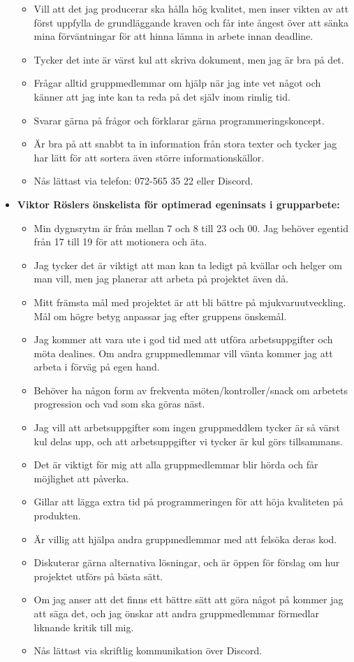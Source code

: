 \documentclass{mall}
\begin{document}
\begin{itemize}
\begin{itemize}
  \item Vill att det jag producerar ska hålla hög kvalitet, men inser vikten av att först uppfylla de grundläggande kraven och får inte ångest över att sänka mina förväntningar för att hinna lämna in arbete innan deadline. 
  \item Tycker det inte är värst kul att skriva dokument, men jag är bra på det.
  \item Frågar alltid gruppmedlemmar om hjälp när jag inte vet något och känner att jag inte kan ta reda på det själv inom rimlig tid.
  \item Svarar gärna på frågor och förklarar gärna programmeringskoncept.
  \item Är bra på att snabbt ta in information från stora texter och tycker jag har lätt för att sortera även större informationskällor.
  \item Nås lättast via telefon: 072-565 35 22 eller Discord.
  \end{itemize}

\item \textbf{Viktor Röslers önskelista för optimerad egeninsats i grupparbete:}
  \begin{itemize}
  \item Min dygnsrytm är från mellan 7 och 8 till 23 och 00. Jag behöver egentid från 17 till 19 för att motionera och äta.  
  \item Jag tycker det är viktigt att man kan ta ledigt på kvällar och helger om man vill, men jag planerar att arbeta på projektet även då.  
  \item Mitt främsta mål med projektet är att bli bättre på mjukvaruutveckling. Mål om högre betyg anpassar jag efter gruppens önskemål. 
  \item Jag kommer att vara ute i god tid med att utföra arbetsuppgifter och möta dealines. Om andra gruppmedlemmar vill vänta kommer jag att arbeta i förväg på egen hand.
  \item Behöver ha någon form av frekventa möten/kontroller/snack om arbetets progression och vad som ska göras näst.
  \item Jag vill att arbetsuppgifter som ingen gruppmeddlem tycker är så värst kul delas upp, och att arbetsuppgifter vi tycker är kul görs tillsammans. 
  \item Det är viktigt för mig att alla gruppmedlemmar blir hörda och får möjlighet att påverka.
  \item Gillar att lägga extra tid på programmeringen för att höja kvaliteten på produkten.   
  \item Är villig att hjälpa andra gruppmedlemmar med att felsöka deras kod.
  \item Diskuterar gärna alternativa lösningar, och är öppen för förslag om hur projektet utförs på bästa sätt.
  \item Om jag anser att det finns ett bättre sätt att göra något på kommer jag att säga det, och jag önskar att andra gruppmedlemmar förmedlar liknande kritik till mig.
  \item Nås lättast via skriftlig kommunikation över Discord.\\
  \end{itemize}


\end{itemize}
\end{document}
